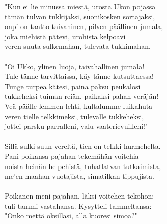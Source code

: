 "Kun ei lie minussa miestä, urosta Ukon pojassa                        \\
tämän tulvan tukkijaksi, suonikosken sortajaksi,                       \\
onp' on taatto taivahinen, pilven-päällinen jumala,                    \\
joka miehistä pätevi, urohista kelpoavi                                \\
veren suuta sulkemahan, tulevata tukkimahan.                           \\
                                                                       \\
"Oi Ukko, ylinen luoja, taivahallinen jumala!                          \\
Tule tänne tarvittaissa, käy tänne kutsuttaessa!                       \\
Tunge turpea kätesi, paina paksu peukalosi                             \\
tukkeheksi tuiman reiän, paikaksi pahan veräjän!                       \\
Veä päälle lemmen lehti, kultalumme luikahuta                          \\
veren tielle telkkimeksi, tulevalle tukkeheksi,                        \\
jottei parsku parralleni, valu vaaterievuilleni!"                      \\
                                                                       \\
Sillä sulki suun vereltä, tien on telkki hurmehelta.                   \\
Pani poikansa pajahan tekemähän voitehia                               \\
noista heinän helpehistä, tuhatlatvan tutkaimista,                     \\
me'en maahan vuotajista, simatilkan tippujista.                        \\
                                                                       \\
Poikanen meni pajahan, läksi voitehen tekohon;                         \\
tuli tammi vastahansa. Kysytteli tammeltansa:                          \\
"Onko mettä oksillasi, alla kuoresi simoa?"                            \\
                                                                       \\
